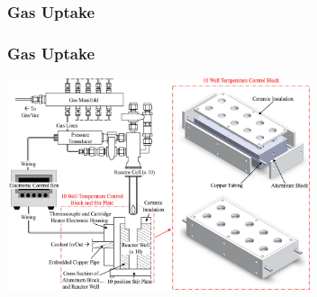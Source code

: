 \documentclass{presentation}
\begin{document}
\begin{frame}\frametitle{Gas Uptake}
\end{frame}

\begin{frame}\frametitle{Gas Uptake}
  \centering
  \includegraphics[width=3.5in]{"./044103_1_f2.jpeg"}
\end{frame}
\end{document}
